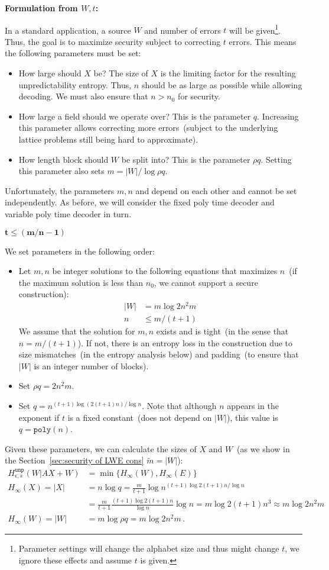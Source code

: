 \documentclass[11pt]{article}
\newcommand{\secref}[1]{\mbox{Section~\ref{#1}}}
\newcommand{\unp}{\ensuremath{\mathtt{unp}}\xspace}
\newcommand{\poly}{\ensuremath{\mathtt{poly}}\xspace}
\begin{document}
{\textbf{Formulation from $W, t$:}

In a standard application, a source $W$ and number of errors $t$ will be given\footnote{Parameter settings will change the alphabet size and thus might change $t$, we ignore these effects and assume $t$ is given.}.  Thus, the goal is to maximize security subject to correcting $t$ errors.  This means the following parameters must be set:
\begin{itemize}
\item How large should $X$ be?  The size of $X$ is the limiting factor for the resulting unpredictability entropy.  Thus, $n$ should be as large as possible while allowing decoding.  We must also ensure that $n>n_0$ for security.
\item How large a field should we operate over?  This is the parameter $q$.  Increasing this parameter allows correcting more errors~(subject to the underlying lattice problems still being hard to approximate).
\item How length block should $W$ be split into?  This is the parameter $\rho q$.  Setting this parameter also sets $m = |W|/\log \rho q$.
\end{itemize}

Unfortunately, the parameters $m, n$ and depend on each other and cannot be set independently.  As before, we will consider the fixed poly time decoder and variable poly time decoder in turn.

$\mathbf{t\leq (m/n-1)}$

We set parameters in the following order:
\begin{itemize}
\item Let $m, n$ be integer solutions to the following equations that maximizes $n$~(if the maximum solution is less than $n_0$, we cannot support a secure construction):
\begin{align*}
|W| &= m\log 2n^2m\\
n&\leq m/(t+1)
\end{align*}
We assume that the solution for $m,n$ exists and is tight~(in the sense that $n = m/(t+1)$).  If not, there is an entropy loss in the construction due to size mismatches~(in the entropy analysis below) and padding~(to ensure that $|W|$ is an integer number of blocks).
\item Set $\rho q = 2n^2m $.
\item Set $q = n^{(t+1)\log( 2(t+1)n)/\log n}$.  Note that although $n$ appears in the exponent if $t$ is a fixed constant~(does not depend on $|W|$), this value is $q =\poly(n)$.  
\end{itemize}  Given these parameters, we can calculate the sizes of $X$ and $W$~(as we show in the \secref{sec:security of LWE cons} $\tilde{m} =|W|$):
\begin{align*}
H^{\unp}_{\epsilon, s} ( W | AX+W) &= \min\{ H_\infty(W), H_\infty(E)\}\\
H_\infty(X) = |X| &= n \log q= \frac{m}{t+1}\log n^{(t+1)\log 2(t+1)n/\log n} \\
&= \frac{m}{t+1} \frac{(t+1)\log 2(t+1)n}{\log n} \log n = m \log 2(t+1)n^3 \approx m\log 2n^2m\\
H_\infty(W) = |W| & = m \log \rho q = m \log 2n^2 m\,.
\end{align*}

}
\end{document}

